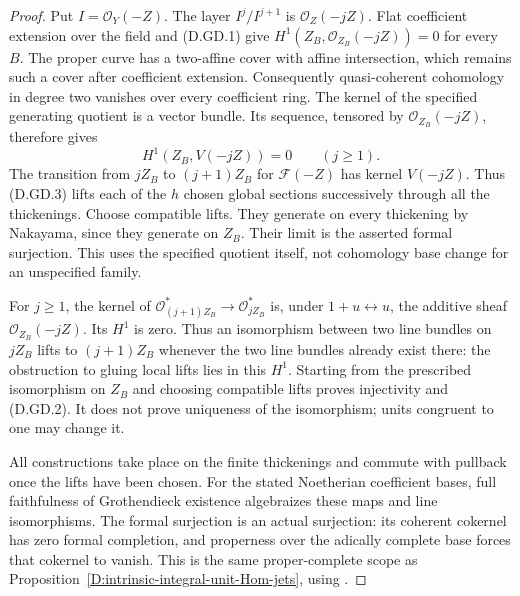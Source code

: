 \begin{proof}
Put $I=\mathcal O_Y(-Z)$. The layer $I^j/I^{j+1}$ is
$\mathcal O_Z(-jZ)$. Flat coefficient extension over the
field and (D.GD.1) give
$H^1(Z_B,\mathcal O_{Z_B}(-jZ))=0$ for every $B$.
The proper curve has a two-affine cover with affine
intersection, which remains such a cover after coefficient
extension. Consequently quasi-coherent cohomology in degree
two vanishes over every coefficient ring. The kernel of the
specified generating quotient is a vector bundle. Its
sequence, tensored by $\mathcal O_{Z_B}(-jZ)$, therefore gives
\[
                    H^1(Z_B,V(-jZ))=0\qquad(j\ge1).
                                                        \tag{D.GD.3}
\]
The transition from $jZ_B$ to $(j+1)Z_B$ for
$\mathcal F(-Z)$ has kernel $V(-jZ)$. Thus (D.GD.3)
lifts each of the $h$ chosen global sections successively
through all the thickenings. Choose compatible lifts.
They generate on every thickening by Nakayama, since they
generate on $Z_B$. Their limit is the asserted formal
surjection. This uses the specified quotient itself, not
cohomology base change for an unspecified family.

For $j\ge1$, the kernel of
$\mathcal O_{(j+1)Z_B}^{*}\to\mathcal O_{jZ_B}^{*}$
is, under $1+u\leftrightarrow u$, the additive sheaf
$\mathcal O_{Z_B}(-jZ)$. Its $H^1$ is zero. Thus an
isomorphism between two line bundles on $jZ_B$ lifts to
$(j+1)Z_B$ whenever the two line bundles already exist
there: the obstruction to gluing local lifts lies in this
$H^1$. Starting from the prescribed isomorphism on $Z_B$
and choosing compatible lifts proves injectivity and
(D.GD.2). It does not prove uniqueness of the isomorphism;
units congruent to one may change it.

All constructions take place on the finite thickenings
and commute with pullback once the lifts have been chosen.
For the stated Noetherian coefficient bases, full faithfulness
of Grothendieck existence algebraizes these maps and line
isomorphisms. The formal surjection is an actual surjection:
its coherent cokernel has zero formal completion, and
properness over the adically complete base forces that
cokernel to vanish. This is the same proper-complete scope
as Proposition~\ref{D:intrinsic-integral-unit-Hom-jets},
using \citet[Theorem 30.27.1, Tag 088E]{StacksIntrinsicUnitHomD}.
\end{proof}

